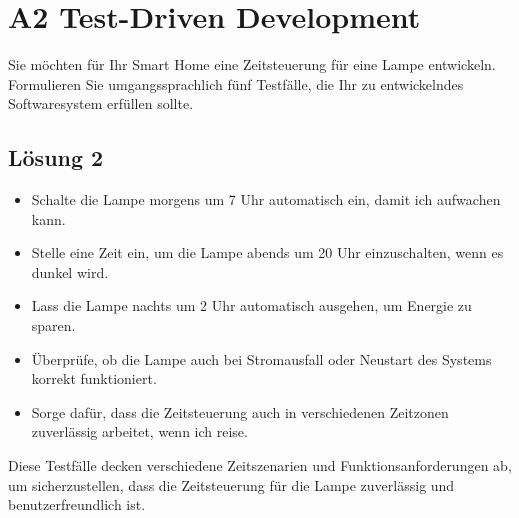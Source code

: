 \documentclass[main.tex]{subfiles}
\begin{document}
\section{A2 Test-Driven Development}
Sie möchten für Ihr Smart Home eine Zeitsteuerung für eine Lampe entwickeln. Formulieren Sie umgangssprachlich fünf Testfälle, die Ihr zu entwickelndes Softwaresystem erfüllen sollte.

\subsection{Lösung 2}
\begin{itemize}
    \item \glqq Schalte die Lampe morgens um 7 Uhr automatisch ein, damit ich aufwachen kann.\grqq
    \item \glqq Stelle eine Zeit ein, um die Lampe abends um 20 Uhr einzuschalten, wenn es dunkel wird.\grqq
    \item \glqq Lass die Lampe nachts um 2 Uhr automatisch ausgehen, um Energie zu sparen.\grqq
    \item \glqq Überprüfe, ob die Lampe auch bei Stromausfall oder Neustart des Systems korrekt funktioniert.\grqq
    \item \glqq Sorge dafür, dass die Zeitsteuerung auch in verschiedenen Zeitzonen zuverlässig arbeitet, wenn ich reise.\grqq
\end{itemize}

Diese Testfälle decken verschiedene Zeitszenarien und Funktionsanforderungen ab, um sicherzustellen, dass die Zeitsteuerung für die Lampe zuverlässig und benutzerfreundlich ist.
\end{document}
